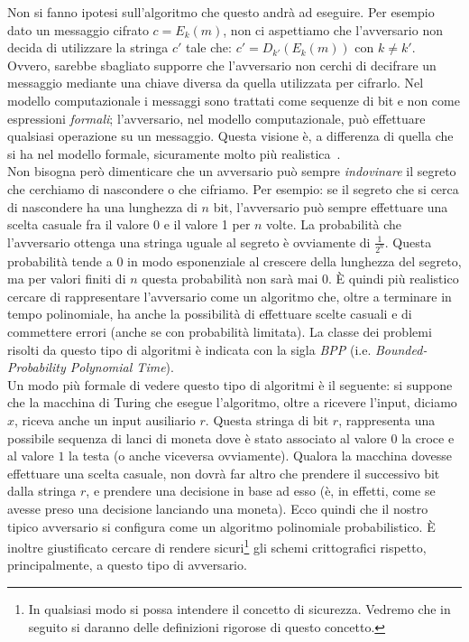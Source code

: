 \documentclass[a4paper,openright,twoside,12pt]{report}
\begin{document}
Non si fanno ipotesi sull'algoritmo che questo andr\`a ad eseguire.
Per esempio dato un messaggio cifrato $c=E_k(m)$, non ci aspettiamo che l'avversario non decida di utilizzare la stringa $c'$ tale che:  $c'=D_{k'}(E_k(m))$ con $k\neq k'$. 
Ovvero, sarebbe sbagliato supporre che l'avversario non cerchi di decifrare un messaggio mediante una chiave diversa 
da quella utilizzata per cifrarlo.
Nel modello computazionale i messaggi sono trattati come sequenze di bit e non come espressioni \emph{formali}; l'avversario, nel modello computazionale, pu\`o effettuare qualsiasi operazione su un messaggio. Questa visione \`e, a differenza di quella 
che si ha nel modello formale, sicuramente molto pi\`u realistica~\cite{DBLP:conf/crypto/2006}.\\

Non bisogna per\`o dimenticare che un avversario può sempre \emph{indovinare} il segreto che cerchiamo di nascondere o che cifriamo. 
Per esempio: se il segreto che si cerca di nascondere ha una lunghezza di $n$ bit, l'avversario pu\`o sempre effettuare una scelta casuale fra il valore 0 e il valore 1 per $n$ volte.
La probabilit\`a che l'avversario ottenga una stringa uguale al segreto \`e ovviamente di $\frac{1}{2^n}$. 
Questa probabilit\`a tende a 0 in modo esponenziale al crescere della lunghezza del segreto, ma per valori finiti di $n$ questa probabilit\`a non sar\`a mai 0.
\`E quindi pi\`u realistico cercare di rappresentare l'avversario come un algoritmo che, oltre a terminare in tempo polinomiale, ha
anche la possibilit\`a di effettuare scelte casuali e di commettere errori (anche se con probabilit\`a limitata).
La classe dei problemi risolti da questo tipo di algoritmi \`e indicata con la
sigla \emph{BPP} (i.e. \emph{Bounded-Probability Polynomial Time}).\\Un modo pi\`u formale di vedere questo tipo di algoritmi \`e il seguente: si suppone che la macchina di Turing che 
esegue l'algoritmo, oltre a ricevere l'input, diciamo $x$, riceva anche un input ausiliario $r$. Questa stringa di bit $r$, rappresenta una possibile sequenza di lanci di moneta dove \`e stato associato al valore $0$ la croce e al valore $1$ la testa (o anche viceversa ovviamente).
Qualora la macchina dovesse effettuare una scelta casuale, non dovr\`a far altro che prendere il successivo bit dalla stringa $r$, e prendere una decisione in base ad esso
(\`e, in effetti, come se avesse preso una decisione lanciando una moneta). Ecco quindi che il nostro tipico avversario si configura come un algoritmo polinomiale probabilistico.
\`E inoltre giustificato cercare di rendere sicuri\footnote{In qualsiasi modo si possa intendere il concetto di sicurezza. Vedremo che in seguito si daranno delle definizioni rigorose di questo concetto.} gli schemi crittografici rispetto, principalmente, a questo tipo di avversario.
\end{document}
